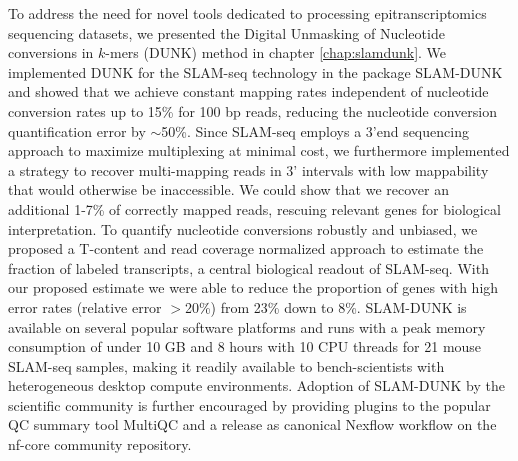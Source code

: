 To address the need for novel tools dedicated to processing epitranscriptomics sequencing datasets, we presented the Digital Unmasking of Nucleotide conversions in $k$-mers (DUNK) method in chapter \ref{chap:slamdunk}. We implemented DUNK for the SLAM-seq technology in the package SLAM-DUNK and showed that we achieve constant mapping rates independent of nucleotide conversion rates up to 15\% for 100 bp reads, reducing the nucleotide conversion quantification error by $\sim$50\%. Since SLAM-seq employs a 3'end sequencing approach to maximize multiplexing at minimal cost, we furthermore implemented a strategy to recover multi-mapping reads in 3' intervals with low mappability that would otherwise be inaccessible. We could show that we recover an additional 1-7\% of correctly mapped reads, rescuing relevant genes for biological interpretation. To quantify nucleotide conversions robustly and unbiased, we proposed a T-content and read coverage normalized approach to estimate the fraction of labeled transcripts, a central biological readout of SLAM-seq. With our proposed estimate we were able to reduce the proportion of genes with high error rates (relative error $>$20\%) from 23\% down to 8\%. SLAM-DUNK is available on several popular software platforms and runs with a peak memory consumption of under 10 GB and 8 hours with 10 CPU threads for 21 mouse SLAM-seq samples, making it readily available to bench-scientists with heterogeneous desktop compute environments. Adoption of SLAM-DUNK by the scientific community is further encouraged by providing plugins to the popular QC summary tool MultiQC and a release as canonical Nexflow workflow on the nf-core community repository. \\
